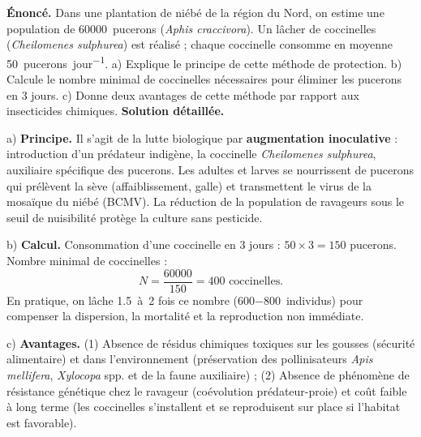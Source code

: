 \documentclass[11pt]{article}
\begin{document}
\begin{exoresolu}
\textbf{Énoncé.} Dans une plantation de niébé de la région du Nord, on estime une population de \SI{60 000}{pucerons} (\emph{Aphis craccivora}). Un lâcher de coccinelles (\emph{Cheilomenes sulphurea}) est réalisé ; chaque coccinelle consomme en moyenne \SI{50}{pucerons.jour^{-1}}. a) Explique le principe de cette méthode de protection. b) Calcule le nombre minimal de coccinelles nécessaires pour éliminer les pucerons en 3 jours. c) Donne deux avantages de cette méthode par rapport aux insecticides chimiques.
\tcblower
\textbf{Solution détaillée.}

a) \textbf{Principe.} Il s'agit de la lutte biologique par \textbf{augmentation inoculative} : introduction d'un prédateur indigène, la coccinelle \emph{Cheilomenes sulphurea}, auxiliaire spécifique des pucerons. Les adultes et larves se nourrissent de pucerons qui prélèvent la sève (affaiblissement, galle) et transmettent le virus de la mosaïque du niébé (BCMV). La réduction de la population de ravageurs sous le seuil de nuisibilité protège la culture sans pesticide.

b) \textbf{Calcul.} Consommation d'une coccinelle en 3 jours : $50 \times 3 = 150$ pucerons.
Nombre minimal de coccinelles :
\[ N = \frac{60 000}{150} = 400 \text{ coccinelles.} \]
En pratique, on lâche \SI{1,5}{à 2} fois ce nombre (\SI{600-800}{individus}) pour compenser la dispersion, la mortalité et la reproduction non immédiate.

c) \textbf{Avantages.} (1) Absence de résidus chimiques toxiques sur les gousses (sécurité alimentaire) et dans l'environnement (préservation des pollinisateurs \emph{Apis mellifera}, \emph{Xylocopa} spp. et de la faune auxiliaire) ; (2) Absence de phénomène de résistance génétique chez le ravageur (coévolution prédateur-proie) et coût faible à long terme (les coccinelles s'installent et se reproduisent sur place si l'habitat est favorable).
\end{exoresolu}
\end{document}
